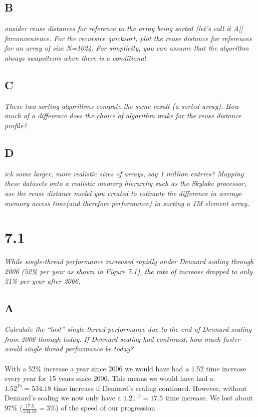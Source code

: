 \documentclass[10pt]{article}
\begin{document}
\subsection{B}
\textit{onsider reuse distances for reference to the array being sorted (let’s call it A[] 
forconvenience. For the recursive quicksort, plot the reuse distance for references for an 
array of size N=1024. For simplicity, you can assume that the algorithm always swapsitems when 
there is a conditional.}
\subsection{C}
\textit{These two sorting algorithms compute the same result (a sorted array). How much of a 
difference does the choice of algorithm make for the reuse distance profile?}
\subsection{D}
\textit{ick some larger, more realistic sizes of arrays, say 1 million entries? Mapping these 
datasets onto a realistic memory hierarchy such as the Skylake processor, use the reuse distance
model you created to estimate the difference in average memory access time(and therefore performance) 
in sorting a 1M element array.}
\paragraph{}

\section{7.1}
\textit{While single-thread performance increased rapidly under Dennard scaling through
2006 (52\% per year as shown in Figure 7.1), the rate of increase dropped to only 21\% per
year after 2006.}
\subsection{A}
\textit{Calculate the “lost” single-thread performance due to the end of Dennard scaling from
2006 through today. If Dennard scaling had continued, how much faster would single
thread performance be today?}
\paragraph{}With a 52\% increase a year since 2006 we would have had a 1.52 time increase every year for 
15 years since 2006. This means we would have had a $1.52 ^ 15 = 534.18$ time increase if Dennard's scaling continued. 
However, without Dennard's scaling we now only have a $1.21 ^ 15 = 17.5$ time increase. We lost about 97\% ($\frac{17.5}{534.18} = 3\%$)
of the speed of our progression.  
\end{document}
